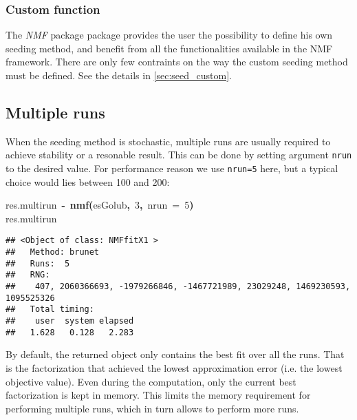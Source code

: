 \documentclass[a4paper]{article}\usepackage{graphicx, color}
\makeatletter
\newcommand{\hlnumber}[1]{\textcolor[rgb]{0,0,0}{#1}}%
\newcommand{\hlfunctioncall}[1]{\textcolor[rgb]{0.501960784313725,0,0.329411764705882}{\textbf{#1}}}%
\newcommand{\hlkeyword}[1]{\textcolor[rgb]{0,0,0}{\textbf{#1}}}%
\newcommand{\hlargument}[1]{\textcolor[rgb]{0.690196078431373,0.250980392156863,0.0196078431372549}{#1}}%
\newcommand{\hlassignement}[1]{\textcolor[rgb]{0,0,0}{\textbf{#1}}}%
\newcommand{\hlsymbol}[1]{\textcolor[rgb]{0,0,0}{#1}}%
\newcommand{\hlstd}[1]{\textcolor[rgb]{0,0,0}{#1}}%
\newenvironment{kframe}{%
 \def\FrameCommand##1{\hskip\@totalleftmargin \hskip-\fboxsep
 \colorbox{shadecolor}{##1}\hskip-\fboxsep
     \hskip-\linewidth \hskip-\@totalleftmargin \hskip\columnwidth}%
 \MakeFramed {\advance\hsize-\width
   \@totalleftmargin\z@ \linewidth\hsize
   \@setminipage}}%
 {\par\unskip\endMakeFramed}
\newenvironment{knitrout}{}{} %
\let\code=\texttt
\newcommand{\pkgname}[1]{\textit{#1}\xspace}
\newcommand{\Rpkg}[1]{\pkgname{#1} package\xspace}
\newcommand{\nmfpack}{\Rpkg{NMF}}
\makeatother
\begin{document}
\subsubsection{Custom function}
The \nmfpack package provides the user the possibility to define his own seeding method, and benefit from all the functionalities available in the NMF framework.
There are only few contraints on the way the custom seeding method must be defined.
See the details in \cref{sec:seed_custom}.

\subsection{Multiple runs}

When the seeding method is stochastic, multiple runs are usually required to achieve stability or a resonable result.
This can be done by setting argument \code{nrun} to the desired value. 
For performance reason we use \code{nrun=5} here, but a typical choice would lies between 100 and 200:  

\begin{knitrout}
\color{fgcolor}\begin{kframe}
\begin{flushleft}
\ttfamily\noindent
\hlsymbol{res.multirun}{\ }\hlassignement{\usebox{\hlnormalsizeboxlessthan}-}{\ }\hlfunctioncall{nmf}\hlkeyword{(}\hlsymbol{esGolub}\hlkeyword{,}{\ }\hlnumber{3}\hlkeyword{,}{\ }\hlargument{nrun}{\ }\hlargument{=}{\ }\hlnumber{5}\hlkeyword{)}\hspace*{\fill}\\
\hlstd{}\hlsymbol{res.multirun}\mbox{}
\normalfont
\end{flushleft}
\begin{verbatim}
## <Object of class: NMFfitX1 >
##   Method: brunet 
##   Runs:  5 
##   RNG:
##    407, 2060366693, -1979266846, -1467721989, 23029248, 1469230593, 1095525326 
##   Total timing:
##    user  system elapsed 
##   1.628   0.128   2.283 
\end{verbatim}
\end{kframe}
\end{knitrout}


By default, the returned object only contains the best fit over all the runs.
That is the factorization that achieved the lowest approximation error (i.e. the lowest objective value).
Even during the computation, only the current best factorization is kept in memory.
This limits the memory requirement for performing multiple runs, which in turn allows to perform more runs.
\end{document}
